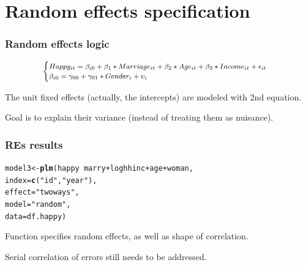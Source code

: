 \documentclass[10pt,english,dvipsnames,aspectratio=169,handout]{beamer}\usepackage[]{graphicx}\usepackage[]{xcolor}
\makeatletter
\newcommand{\hlstr}[1]{\textcolor[rgb]{0.192,0.494,0.8}{#1}}%
\newcommand{\hlopt}[1]{\textcolor[rgb]{0,0,0}{#1}}%
\newcommand{\hlstd}[1]{\textcolor[rgb]{0.345,0.345,0.345}{#1}}%
\newcommand{\hlkwb}[1]{\textcolor[rgb]{0.69,0.353,0.396}{#1}}%
\newcommand{\hlkwc}[1]{\textcolor[rgb]{0.333,0.667,0.333}{#1}}%
\newcommand{\hlkwd}[1]{\textcolor[rgb]{0.737,0.353,0.396}{\textbf{#1}}}%
\newenvironment{kframe}{%
 \def\at@end@of@kframe{}%
 \ifinner\ifhmode%
  \def\at@end@of@kframe{\end{minipage}}%
  \begin{minipage}{\columnwidth}%
 \fi\fi%
 \def\FrameCommand##1{\hskip\@totalleftmargin \hskip-\fboxsep
 \colorbox{shadecolor}{##1}\hskip-\fboxsep
     \hskip-\linewidth \hskip-\@totalleftmargin \hskip\columnwidth}%
 \MakeFramed {\advance\hsize-\width
   \@totalleftmargin\z@ \linewidth\hsize
   \@setminipage}}%
 {\par\unskip\endMakeFramed%
 \at@end@of@kframe}
\newenvironment{knitrout}{}{} %
\makeatother
\begin{document}
\section{Random effects specification}

\begin{frame}
  \frametitle{Random effects logic}

\begin{equation}
\footnotesize
  \begin{cases}
  Happy_{it} = \beta_{i0} + \beta_{1}*Marriage_{it} + \beta_{2}*Age_{it} + \beta_{3}*Income_{it} + \epsilon_{it} \\
  \beta_{i0} = \gamma_{00} + \gamma_{01}*Gender_{i} + \upsilon_{i}
  \end{cases}
\end{equation}
  \pause

  The unit fixed effects (actually, the intercepts) are modeled with 2nd equation.\bigskip
  \pause
  
  Goal is to explain their variance (instead of treating them as nuisance).
  
\end{frame}


\begin{frame}
  \frametitle{REs results}
  
\begin{knitrout}\scriptsize
{}\color{fgcolor}\begin{kframe}
\begin{alltt}
\hlstd{model3} \hlkwb{<-} \hlkwd{plm}\hlstd{(happy} \hlopt{~} \hlstd{marry} \hlopt{+} \hlstd{loghhinc} \hlopt{+} \hlstd{age} \hlopt{+} \hlstd{woman,}
              \hlkwc{index} \hlstd{=} \hlkwd{c}\hlstd{(}\hlstr{"id"}\hlstd{,}\hlstr{"year"}\hlstd{),}
              \hlkwc{effect} \hlstd{=} \hlstr{"twoways"}\hlstd{,}
              \hlkwc{model} \hlstd{=} \hlstr{"random"}\hlstd{,}
              \hlkwc{data} \hlstd{= df.happy)}
\end{alltt}
\end{kframe}
\end{knitrout}
  
 Function specifies random effects, as well as shape of correlation.\bigskip
 \pause
 
 Serial correlation of errors still needs to be addressed.
  
\end{frame}
\end{document}
